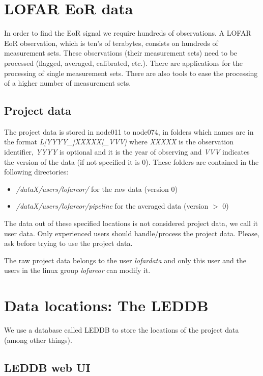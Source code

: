 \documentclass[a4paper,11pt]{article}
\begin{document}
\section{LOFAR EoR data}

In order to find the EoR signal we require hundreds of observations. A LOFAR EoR observation, which is ten's of terabytes, consists on hundreds of measurement sets. These observations (their measurement sets) need to be processed (flagged, averaged, calibrated, etc.). There are applications for the processing of single measurement sets. There are also tools to ease the processing of a higher number of measurement sets.

\subsection*{Project data}

The project data is stored in node011 to node074, in folders which names are in the format \textit{L[YYYY\_]XXXXX[\_VVV]} where \textit{XXXXX} is the observation identifier, \textit{YYYY} is optional and it is the year of observing and \textit{VVV} indicates the version of the data (if not specified it is 0). These folders are contained in the following directories:

\begin{itemize}
	\item \textit{/dataX/users/lofareor/} for the raw data (version 0)
	\item \textit{/dataX/users/lofareor/pipeline} for the averaged data (version $>$ 0)
\end{itemize}

The data out of these specified locations is not considered project data, we call it user data. Only experienced users should handle/process the project data. Please, ask before trying to use the project data.

The raw project data belongs to the user \textit{lofardata} and only this user and the users in the linux group \textit{lofareor} can modify it.

\section{Data locations: The LEDDB}

We use a database called LEDDB to store the locations of the project data (among other things). 

\subsection*{LEDDB web UI}
\end{document}
